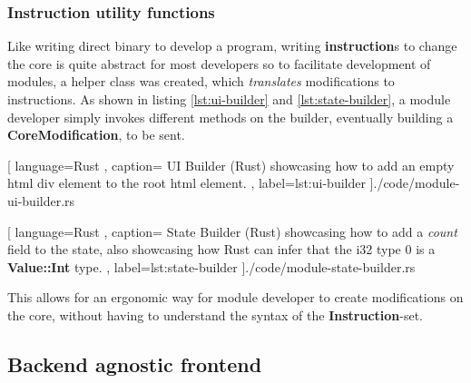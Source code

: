 \subsubsection{Instruction utility functions}

Like writing direct binary to develop a program, writing \textbf{instruction}s to
change the core is quite abstract for most developers so to facilitate development
of modules, a helper class was created, which \textit{translates} modifications
to instructions. As shown in listing \ref{lst:ui-builder} and
\ref{lst:state-builder}, a module developer simply invokes different methods on
the builder, eventually building a \textbf{CoreModification}, to be sent.

\begin{center}
  
   [ language=Rust
   , caption={
     UI Builder (Rust) showcasing how to add an empty \gls*{html} div element to
     the root \gls*{html} element.
   }
   , label=lst:ui-builder
   ]{./code/module-ui-builder.rs}
\end{center}

\begin{center}
  
   [ language=Rust
   , caption={
     State Builder (Rust) showcasing how to add a \textit{count} field to the
     state, also showcasing how Rust can infer that the i32 type $0$ is
     a \textbf{Value::Int} type.
   }
   , label=lst:state-builder
   ]{./code/module-state-builder.rs}
\end{center}

This allows for an ergonomic way for module developer to create modifications on
the core, without having to understand the syntax of the
\textbf{Instruction}-set.


\subsection{Backend agnostic frontend}

